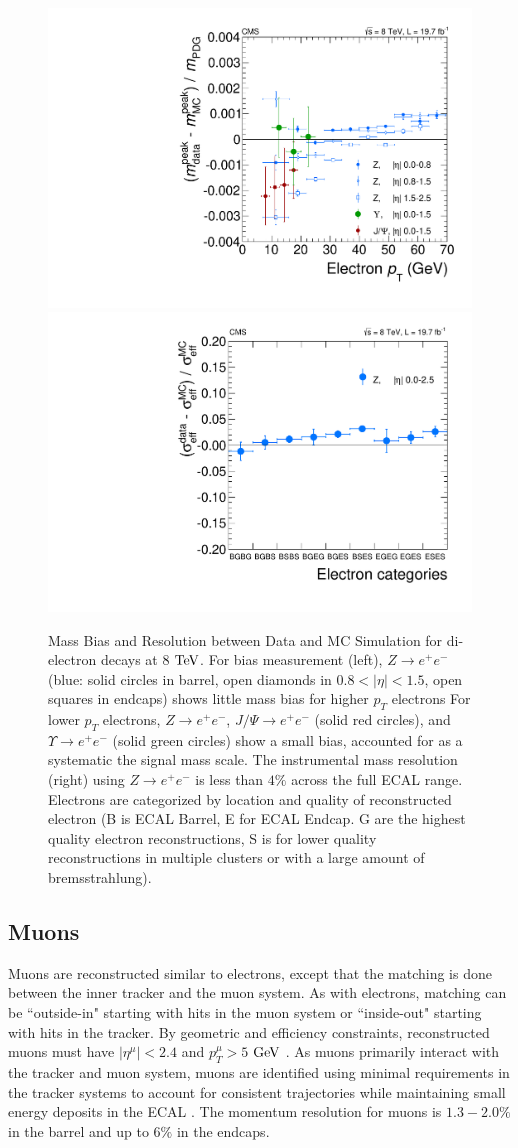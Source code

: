 \begin{figure}[htbp]
\begin{center}
\includegraphics[width=.45\linewidth]{HiggsDiscovery/figures/scale-ptdep-8TeV.pdf}
\includegraphics[width=.45\linewidth]{HiggsDiscovery/figures/electron_resolution.pdf}
\caption[Mass Resolution and Bias from Di-electron Decays]{Mass Bias and Resolution between Data and MC Simulation for di-electron decays at $8$ $\rm{TeV}$. For bias measurement (left), $Z\rightarrow e^+e^-$ (blue: solid circles in barrel, open diamonds in $0.8<|\eta|<1.5$, open squares in endcaps) shows little mass bias for higher $p_T$ electrons For lower $p_T$ electrons, $Z\rightarrow e^+e^-$, $J/\Psi\rightarrow e^+e^-$ (solid red circles), and $\Upsilon\rightarrow e^+e^-$ (solid green circles) show a small bias, accounted for as a systematic the signal mass scale. The instrumental mass resolution (right) using $Z\rightarrow e^+e^-$ is less than $4\%$ across the full ECAL range. Electrons are categorized by location and quality of reconstructed electron (B is ECAL Barrel, E for ECAL Endcap. G are the highest quality electron reconstructions, S is for lower quality reconstructions in multiple clusters or with a large amount of bremsstrahlung).}
\label{fig:ElectronMassResolutionAndBias}
\end{center}
\end{figure}

\subsection{Muons}
\label{sec:zz4lMuons}

Muons are reconstructed similar to electrons, except that the matching is done between the inner tracker and the muon system. As with electrons, matching can be ``outside-in" starting with hits in the muon system or ``inside-out" starting with hits in the tracker. By geometric and efficiency constraints, reconstructed muons must have $|\eta^\mu|<2.4$ and $p_T^\mu>5$ $\rm{GeV}$ \cite{}. As muons primarily interact with the tracker and muon system, muons are identified using minimal requirements in the tracker systems to account for consistent trajectories while maintaining small energy deposits in the ECAL \cite{}. The momentum resolution for muons is $1.3-2.0\%$ in the barrel and up to $6\%$ in the endcaps.

